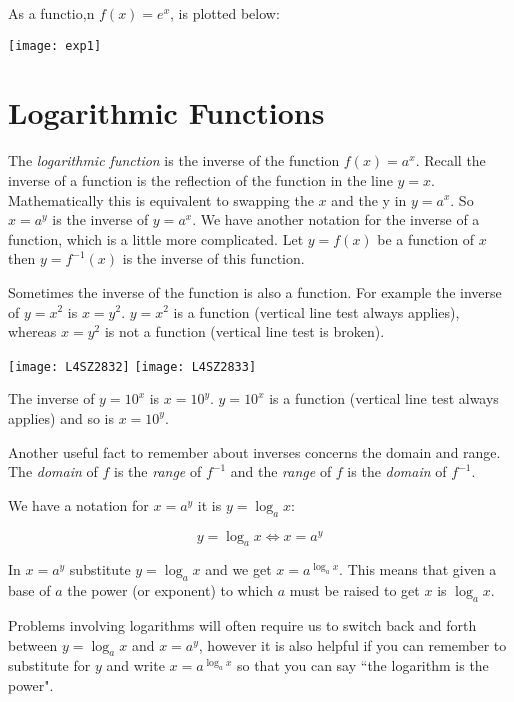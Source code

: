 As a functio,n $f(x)=e^x$, is plotted below:
\begin{center}
	\texttt{[image: exp1]}
\end{center}
\section{Logarithmic Functions}
The \emph{logarithmic function} is the inverse of the function $f (x) =a^{x}$. Recall the inverse of a function is the reflection of the function in the line $y =x$. Mathematically this is equivalent to swapping the $x$ and the y in $y =a^{x}$. So $x =a^{y}$ is the inverse of $y =a^{x}$. We have another notation for the inverse of a function, which is a little more complicated. Let $y =f (x)$ be a function of $x$ then $y =f^{ -1} (x)$ is the inverse of this function. 

Sometimes the inverse of the function is also a function. For example the inverse of $y =x^{2}$ is $x =y^{2}$. $y =x^{2}$ is a function (vertical line test always applies), whereas $x =y^{2}$ is not a function (vertical line test is broken). 

\begin{multicols}{2}
\texttt{[image: L4SZ2832]}
\texttt{[image: L4SZ2833]}
\end{multicols}

The inverse of $y =10^{x}$ is $x =10^{y}$. $y =10^{x}$ is a function (vertical line test always applies) and so is $x =10^{y}$. 

Another useful fact to remember about inverses concerns the domain and range. The \emph{domain}
of $f$ is the \emph{range} of $f^{ -1}$ and the \emph{range} of $f$ is the \emph{domain} of $f^{ -1}$. 

We have a notation for $x =a^{y}$ it is $y =\log _{a} x$:
\begin{tcolorbox}
\[y =\log _{a} x \Leftrightarrow x =a^y
\]
\end{tcolorbox}


In $x =a^{y}$ substitute $y =\log _{a} x$ and we get $x =a^{\log _{a} x}$. This means that given a base of $a$ the power (or exponent) to which $a$ must be raised to get $x$ is $\log _{a} x$. 

Problems involving logarithms will often require us to switch back and forth between $y =\log _{a} x$ and $x =a^{y}$, however it is also helpful if you can remember to substitute for $y$ and write $x =a^{\log _{a} x}$ so that you can say ``the logarithm is the power". 

